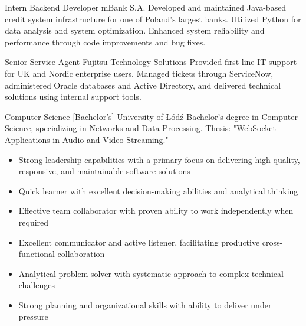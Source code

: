 \documentclass[9pt]{developercv}%
\begin{document}
\begin{entrylist}
		 {Intern Backend Developer} {mBank S.A.} {Developed and maintained Java-based credit system infrastructure for one of Poland's largest banks. Utilized Python for data analysis and system optimization. Enhanced system reliability and performance through code improvements and bug fixes.}

		 {Senior Service Agent} {Fujitsu Technology Solutions}
		{Provided first-line IT support for UK and Nordic enterprise users. Managed tickets through ServiceNow, administered Oracle databases and Active Directory, and delivered technical solutions using internal support tools.}
	\end{entrylist}



	\begin{entrylist}
		 {Computer Science [Bachelor's]} {University of Łódź} {Bachelor's degree in Computer Science, specializing in Networks and Data Processing. Thesis: "WebSocket Applications in Audio and Video Streaming."}
	\end{entrylist}


	\begin{itemize}
		\item Strong leadership capabilities with a primary focus on delivering high-quality,
			responsive, and maintainable software solutions

		\item Quick learner with excellent decision-making abilities and analytical thinking

		\item Effective team collaborator with proven ability to work independently when
			required

		\item Excellent communicator and active listener, facilitating productive
			cross-functional collaboration

		\item Analytical problem solver with systematic approach to complex technical
			challenges

		\item Strong planning and organizational skills with ability to deliver under
			pressure
	\end{itemize}
\end{document}
